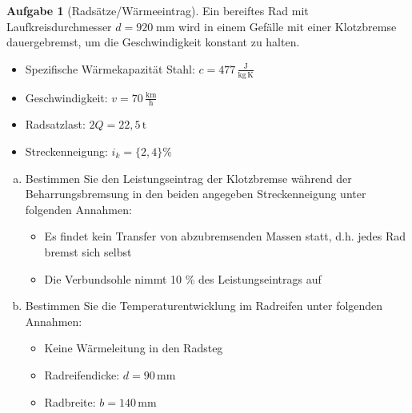 \documentclass[10pt,a4paper,headsepline,smallheadings]{scrartcl}
\theoremstyle{definition}
\newtheorem{aufgabe}{Aufgabe}
\begin{document}
\begin{aufgabe}[Rads\"atze/W\"armeeintrag]
Ein bereiftes Rad mit Laufkreisdurchmesser $d = 920\; \mathrm{mm}$ wird in einem Gef\"alle mit einer Klotzbremse dauergebremst, um die Geschwindigkeit konstant zu halten. 

\begin{itemize}
	\item Spezifische W\"armekapazit\"at Stahl: $c = 477 \, \frac{\mathrm{J}}{\mathrm{kg}\, \mathrm{K}}$
	\item Geschwindigkeit: $v = 70\, \frac{\mathrm{km}}{\mathrm{h}}$
	\item Radsatzlast: $ 2 Q = 22{,5} \, \mathrm{t}$
	\item Streckenneigung: $i_{k} = \{2, 4\} \%$
\end{itemize}
\begin{enumerate}[a)]
\item Bestimmen Sie den Leistungseintrag der Klotzbremse w\"ahrend der Beharrungsbremsung in den beiden angegeben Streckenneigung unter folgenden Annahmen:
	\begin{itemize}
		\item Es findet kein Transfer von abzubremsenden Massen statt, d.h. jedes Rad bremst sich selbst
		\item Die Verbundsohle nimmt 10 \% des Leistungseintrags auf
	\end{itemize}
\item Bestimmen Sie die Temperaturentwicklung im Radreifen unter folgenden Annahmen:
	\begin{itemize}
		\item Keine W\"armeleitung in den Radsteg
		\item Radreifendicke: $d = 90 \, \mathrm{mm}$ 
		\item Radbreite: $b = 140 \, \mathrm{mm}$
	\end{itemize}
\end{enumerate}
\end{aufgabe}
\end{document}
